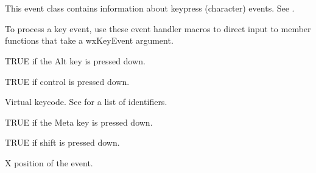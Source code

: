 \section{}\label{wxkeyevent}

This event class contains information about keypress (character) events. See .




To process a key event, use these event handler macros to direct input to member
functions that take a wxKeyEvent argument.

\twocolwidtha{7cm}
\begin{twocollist}\itemsep=0pt
\end{twocollist}%




TRUE if the Alt key is pressed down.



TRUE if control is pressed down.



Virtual keycode. See  for a list of identifiers.



TRUE if the Meta key is pressed down.



TRUE if shift is pressed down.



X position of the event.


